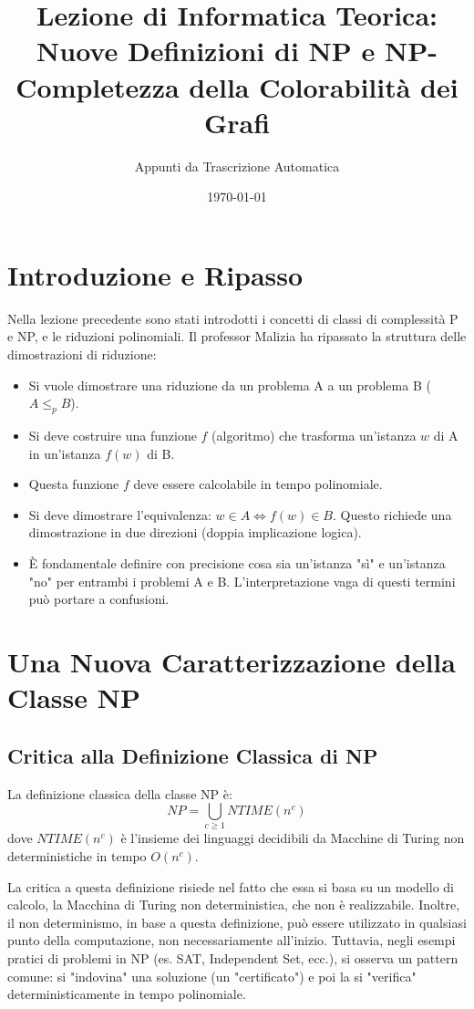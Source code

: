 \documentclass[a4paper]{article}
\title{Lezione di Informatica Teorica: Nuove Definizioni di NP e NP-Completezza della Colorabilità dei Grafi}
\author{Appunti da Trascrizione Automatica}
\date{\today}
\begin{document}
\maketitle
\tableofcontents
\newpage

\section{Introduzione e Ripasso}
Nella lezione precedente sono stati introdotti i concetti di classi di complessità P e NP, e le riduzioni polinomiali.
Il professor Malizia ha ripassato la struttura delle dimostrazioni di riduzione:
\begin{itemize}
    \item Si vuole dimostrare una riduzione da un problema A a un problema B ($A \le_p B$).
    \item Si deve costruire una funzione $f$ (algoritmo) che trasforma un'istanza $w$ di A in un'istanza $f(w)$ di B.
    \item Questa funzione $f$ deve essere calcolabile in tempo polinomiale.
    \item Si deve dimostrare l'equivalenza: $w \in A \iff f(w) \in B$. Questo richiede una dimostrazione in due direzioni (doppia implicazione logica).
    \item È fondamentale definire con precisione cosa sia un'istanza "sì" e un'istanza "no" per entrambi i problemi A e B. L'interpretazione vaga di questi termini può portare a confusioni.
\end{itemize}

\section{Una Nuova Caratterizzazione della Classe NP}

\subsection{Critica alla Definizione Classica di NP}
La definizione classica della classe NP è:
\[ NP = \bigcup_{c \ge 1} NTIME(n^c) \]
dove $NTIME(n^c)$ è l'insieme dei linguaggi decidibili da Macchine di Turing non deterministiche in tempo $O(n^c)$.

La critica a questa definizione risiede nel fatto che essa si basa su un modello di calcolo, la Macchina di Turing non deterministica, che non è realizzabile. Inoltre, il non determinismo, in base a questa definizione, può essere utilizzato in qualsiasi punto della computazione, non necessariamente all'inizio. Tuttavia, negli esempi pratici di problemi in NP (es. SAT, Independent Set, ecc.), si osserva un pattern comune: si "indovina" una soluzione (un "certificato") e poi la si "verifica" deterministicamente in tempo polinomiale.
\end{document}
